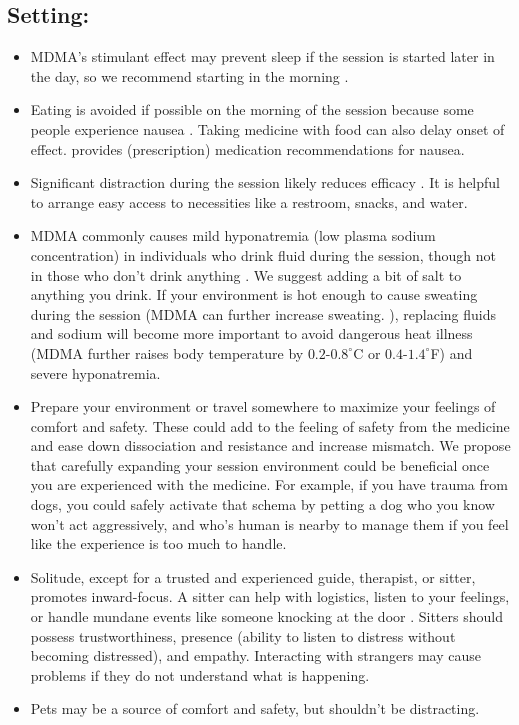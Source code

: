 \documentclass[12pt,letterpaper]{book}
\begin{document}
\subsection*{Setting:}
\begin{itemize}
    \item MDMA's stimulant effect may prevent sleep if the session is started later in the day, so we recommend starting in the morning \cite{berro2018acute}.
    \item Eating is avoided if possible on the morning of the session because some people experience nausea \cite{colcott2024side}. Taking medicine with food can also delay onset of effect. \textcite{liechtiInteractions} provides (prescription) medication recommendations for nausea.
    \item Significant distraction during the session likely reduces efficacy \cite{roseman2024interrupting}. It is helpful to arrange easy access to necessities like a restroom, snacks, and water.
    \item MDMA commonly causes mild hyponatremia (low plasma sodium concentration) in individuals who drink fluid during the session, though not in those who don't drink anything \cite{atilaHyponatremia}. We suggest adding a bit of salt to anything you drink. If your environment is hot enough to cause sweating during the session (MDMA can further increase sweating. \cite{colcott2024side}), replacing fluids and sodium will become more important to avoid dangerous heat illness (MDMA further raises body temperature by $0.2$-$0.8^{\circ}$C or $0.4$-$1.4^{\circ}$F\cite{liechti2014effects}) and severe hyponatremia.
    \label{contextexpansion}
    \item Prepare your environment or travel somewhere to maximize your feelings of comfort and safety. These could add to the feeling of safety from the medicine and ease down dissociation and resistance and increase mismatch. We propose that carefully expanding your session environment could be beneficial once you are experienced with the medicine. For example, if you have trauma from dogs, you could safely activate that schema by petting a dog who you know won't act aggressively, and who's human is nearby to manage them if you feel like the experience is too much to handle.
    \label{def:sitter}
    \item Solitude, except for a trusted and experienced guide, therapist, or sitter, promotes inward-focus. A sitter can help with logistics, listen to your feelings, or handle mundane events like someone knocking at the door \cite{thalSitter}. Sitters should possess trustworthiness, presence (ability to listen to distress without becoming distressed), and empathy. Interacting with strangers may cause problems if they do not understand what is happening. 
    \item Pets may be a source of comfort and safety, but shouldn't be distracting.
\end{itemize}
\end{document}

